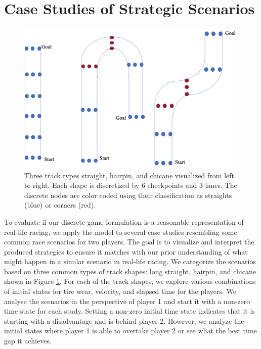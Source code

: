 \section{Case Studies of Strategic Scenarios}
\begin{figure}
\begin{center}
\includegraphics[width=\textwidth]{Figures/TrackShapes.png}
    \caption[Discrete representation of common track shapes.]{\label{fig:track_shapes} Three track types straight, hairpin, and chicane visualized from left to right. Each shape is discretized by 6 checkpoints and 3 lanes. The discrete nodes are color coded using their classification as straights (blue) or corners (red).}
\end{center}
\end{figure}
To evaluate if our discrete game formulation is a reasonable representation of real-life racing, we apply the model to several case studies resembling some common race scenarios for two players. The goal is to visualize and interpret the produced strategies to ensure it matches with our prior understanding of what might happen in a similar scenario in real-life racing. We categorize the scenarios based on three common types of track shapes: long straight, hairpin, and chicane shown in Figure \ref{fig:track_shapes}. For each of the track shapes, we explore various combinations of initial states for tire wear, velocity, and elapsed time for the players. We analyse the scenarios in the perspective of player 1 and start it with a non-zero time state for each study. Setting a non-zero initial time state indicates that it is starting with a disadvantage and is behind player 2. However, we analyze the initial states where player 1 is able to overtake player 2 or see what the best time gap it achieves. 

